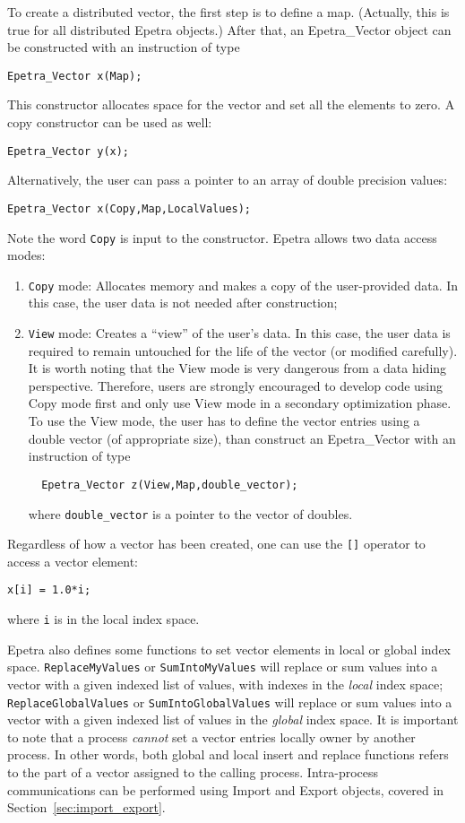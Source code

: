 To create a distributed vector, the first step is to define a map.
(Actually, this is true for all distributed Epetra objects.) After that,
an Epetra\_Vector object can be constructed with an instruction of type
\begin{verbatim}
Epetra_Vector x(Map);
\end{verbatim}
This constructor allocates space for the vector and set all the elements
to zero. A copy constructor can be used as well:
\begin{verbatim}
Epetra_Vector y(x);
\end{verbatim}
Alternatively, the user can pass a pointer to an array of double
precision values:
\begin{verbatim}
Epetra_Vector x(Copy,Map,LocalValues);
\end{verbatim}
Note the word \verb!Copy! is input to the constructor. Epetra allows two
data access modes:
\begin{enumerate}
\item \verb!Copy! mode: Allocates memory and makes a copy of the
  user-provided data. In this case, the user data is not needed after
  construction;
\item \verb!View! mode: Creates a ``view'' of the user's data. In this
  case, the user data is required to remain untouched for the life of
  the vector (or modified carefully). It is worth noting that the View
  mode is very dangerous from a data hiding perspective. Therefore,
  users are strongly encouraged to develop code using Copy mode first
  and only use View mode in a secondary optimization phase. To use the
  View mode, the user has to define the vector entries using a double
  vector (of appropriate size), than construct an Epetra\_Vector with an
  instruction of type
\begin{verbatim}
  Epetra_Vector z(View,Map,double_vector);
\end{verbatim}
  where \verb!double_vector! is a pointer to the vector of doubles.
\end{enumerate}

Regardless of how a vector has been created, one can use the \verb![]!
operator to access a vector element:
\begin{verbatim}
x[i] = 1.0*i;
\end{verbatim}
where \verb!i! is in the local index space. 

Epetra also defines some functions to set vector elements in local or
global index space.  \verb!ReplaceMyValues! or \verb!SumIntoMyValues!
will replace or sum values into a vector with a given indexed list of
values, with indexes in the {\em local} index space;
\verb!ReplaceGlobalValues! or \verb!SumIntoGlobalValues! will replace or
sum values into a vector with a given indexed list of values in the {\em
  global} index space. It is important to note that a process {\sl
  cannot} set a vector entries locally owner by another process. In
other words, both global and local insert and replace functions refers
to the part of a vector assigned to the calling process. Intra-process
communications can be performed using Import and Export objects, covered
in Section~\ref{sec:import_export}.

